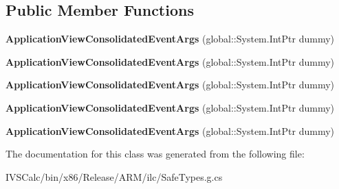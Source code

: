 \subsection*{Public Member Functions}
\begin{DoxyCompactItemize}
\item 
\mbox{\label{class_windows_1_1_u_i_1_1_view_management_1_1_application_view_consolidated_event_args_a92fcd2937b83cdd5dfa762b16e49750d}} 
{\bfseries Application\+View\+Consolidated\+Event\+Args} (global\+::\+System.\+Int\+Ptr dummy)
\item 
\mbox{\label{class_windows_1_1_u_i_1_1_view_management_1_1_application_view_consolidated_event_args_a92fcd2937b83cdd5dfa762b16e49750d}} 
{\bfseries Application\+View\+Consolidated\+Event\+Args} (global\+::\+System.\+Int\+Ptr dummy)
\item 
\mbox{\label{class_windows_1_1_u_i_1_1_view_management_1_1_application_view_consolidated_event_args_a92fcd2937b83cdd5dfa762b16e49750d}} 
{\bfseries Application\+View\+Consolidated\+Event\+Args} (global\+::\+System.\+Int\+Ptr dummy)
\item 
\mbox{\label{class_windows_1_1_u_i_1_1_view_management_1_1_application_view_consolidated_event_args_a92fcd2937b83cdd5dfa762b16e49750d}} 
{\bfseries Application\+View\+Consolidated\+Event\+Args} (global\+::\+System.\+Int\+Ptr dummy)
\item 
\mbox{\label{class_windows_1_1_u_i_1_1_view_management_1_1_application_view_consolidated_event_args_a92fcd2937b83cdd5dfa762b16e49750d}} 
{\bfseries Application\+View\+Consolidated\+Event\+Args} (global\+::\+System.\+Int\+Ptr dummy)
\end{DoxyCompactItemize}


The documentation for this class was generated from the following file\+:\begin{DoxyCompactItemize}
\item 
I\+V\+S\+Calc/bin/x86/\+Release/\+A\+R\+M/ilc/Safe\+Types.\+g.\+cs\end{DoxyCompactItemize}
